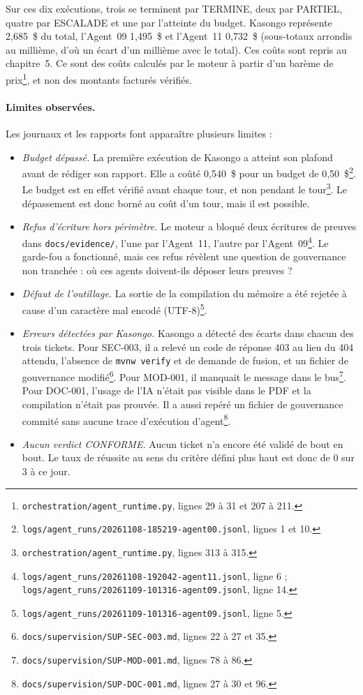 Sur ces dix exécutions, trois se terminent par TERMINE, deux par PARTIEL, quatre par ESCALADE et une par l'atteinte du budget. Kasongo représente 2,685~\$ du total, l'Agent~09 1,495~\$ et l'Agent~11 0,732~\$ (sous-totaux arrondis au millième, d'où un écart d'un millième avec le total). Ces coûts sont repris au chapitre~5. Ce sont des coûts calculés par le moteur à partir d'un barème de prix\footnote{\nolinkurl{orchestration/agent_runtime.py}, lignes 29 à 31 et 207 à 211.}, et non des montants facturés vérifiés.

\paragraph{Limites observées.} Les journaux et les rapports font apparaître plusieurs limites :
\begin{itemize}
  \item \emph{Budget dépassé.} La première exécution de Kasongo a atteint son plafond avant de rédiger son rapport. Elle a coûté 0,540~\$ pour un budget de 0,50~\$\footnote{\nolinkurl{logs/agent_runs/20261108-185219-agent00.jsonl}, lignes 1 et 10.}. Le budget est en effet vérifié avant chaque tour, et non pendant le tour\footnote{\nolinkurl{orchestration/agent_runtime.py}, lignes 313 à 315.}. Le dépassement est donc borné au coût d'un tour, mais il est possible.
  \item \emph{Refus d'écriture hors périmètre.} Le moteur a bloqué deux écritures de preuves dans \nolinkurl{docs/evidence/}, l'une par l'Agent~11, l'autre par l'Agent~09\footnote{\nolinkurl{logs/agent_runs/20261108-192042-agent11.jsonl}, ligne 6 ; \nolinkurl{logs/agent_runs/20261109-101316-agent09.jsonl}, ligne 14.}. Le garde-fou a fonctionné, mais ces refus révèlent une question de gouvernance non tranchée : où ces agents doivent-ils déposer leurs preuves ?
  \item \emph{Défaut de l'outillage.} La sortie de la compilation du mémoire a été rejetée à cause d'un caractère mal encodé (UTF-8)\footnote{\nolinkurl{logs/agent_runs/20261109-101316-agent09.jsonl}, ligne 5.}.
  \item \emph{Erreurs détectées par Kasongo.} Kasongo a détecté des écarts dans chacun des trois tickets. Pour SEC-003, il a relevé un code de réponse 403 au lieu du 404 attendu, l'absence de \texttt{mvnw verify} et de demande de fusion, et un fichier de gouvernance modifié\footnote{\nolinkurl{docs/supervision/SUP-SEC-003.md}, lignes 22 à 27 et 35.}. Pour MOD-001, il manquait le message dans le bus\footnote{\nolinkurl{docs/supervision/SUP-MOD-001.md}, lignes 78 à 86.}. Pour DOC-001, l'usage de l'IA n'était pas visible dans le PDF et la compilation n'était pas prouvée. Il a aussi repéré un fichier de gouvernance commité sans aucune trace d'exécution d'agent\footnote{\nolinkurl{docs/supervision/SUP-DOC-001.md}, lignes 27 à 30 et 96.}.
  \item \emph{Aucun verdict CONFORME.} Aucun ticket n'a encore été validé de bout en bout. Le taux de réussite au sens du critère défini plus haut est donc de 0 sur 3 à ce jour.
\end{itemize}

